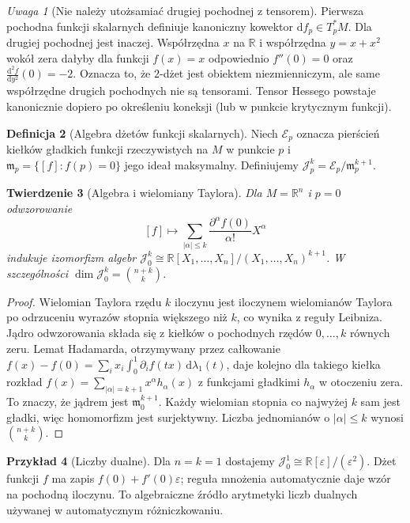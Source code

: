 \documentclass[11pt,a4paper,oneside]{book}
\numberwithin{equation}{chapter}
\theoremstyle{plain}
\newtheorem{twierdzenie}{Twierdzenie}[chapter]
\theoremstyle{definition}
\newtheorem{definicja}[twierdzenie]{Definicja}
\newtheorem{przyklad}[twierdzenie]{Przykład}
\theoremstyle{remark}
\newtheorem{uwaga}[twierdzenie]{Uwaga}
\begin{document}
\begin{uwaga}[Nie należy utożsamiać drugiej pochodnej z tensorem]
\label{rem:dzety-hess}
Pierwsza pochodna funkcji skalarnych definiuje kanoniczny
kowektor $\mathrm df_p\in T_p^*M$. Dla drugiej pochodnej jest inaczej.
Współrzędna $x$ na $\mathbb R$ i współrzędna $y=x+x^2$ wokół zera
dałyby dla funkcji $f(x)=x$ odpowiednio $f''(0)=0$
oraz $\frac{\mathrm d^2 f}{\mathrm dy^2}(0)=-2$.
Oznacza to, że $2$-dżet jest obiektem niezmienniczym,
ale same współrzędne drugich pochodnych nie są tensorami.
Tensor Hessego powstaje kanonicznie dopiero po określeniu
koneksji (lub w punkcie krytycznym funkcji).
\end{uwaga}

\begin{definicja}[Algebra dżetów funkcji skalarnych]
\label{def:dzety-algebra}
Niech $\mathcal E_p$ oznacza pierścień kiełków gładkich
funkcji rzeczywistych na $M$ w punkcie $p$ i
$\mathfrak m_p=\{[f]:f(p)=0\}$ jego ideał maksymalny.
Definiujemy $\mathcal J_p^k=\mathcal E_p/\mathfrak m_p^{k+1}$.
\end{definicja}

\begin{twierdzenie}[Algebra i wielomiany Taylora]
\label{thm:dzety-algebra}
Dla $M=\mathbb R^n$ i $p=0$ odwzorowanie
\[
 [f]\longmapsto \sum_{|\alpha|\le k}
 \frac{\partial^\alpha f(0)}{\alpha!}X^\alpha
\]
indukuje izomorfizm algebr
$\mathcal J_0^k\cong\mathbb R[X_1,\ldots,X_n]/(X_1,\ldots,X_n)^{k+1}$.
W szczególności $\dim\mathcal J_0^k=\binom{n+k}{k}$.
\end{twierdzenie}
\begin{proof}
Wielomian Taylora rzędu $k$ iloczynu jest iloczynem
wielomianów Taylora po odrzuceniu wyrazów stopnia większego niż $k$,
co wynika z reguły Leibniza. Jądro odwzorowania składa się
z kiełków o pochodnych rzędów $0,\ldots,k$ równych zeru.
Lemat Hadamarda, otrzymywany przez całkowanie
$f(x)-f(0)=\sum_i x_i\int_0^1 \partial_i f(tx)\,\mathrm d\lambda_1(t)$,
daje kolejno dla takiego kiełka rozkład
$f(x)=\sum_{|\alpha|=k+1}x^\alpha h_\alpha(x)$
z funkcjami gładkimi $h_\alpha$ w otoczeniu zera.
To znaczy, że jądrem jest $\mathfrak m_0^{k+1}$.
Każdy wielomian stopnia co najwyżej $k$ sam jest gładki,
więc homomorfizm jest surjektywny. Liczba jednomianów
o $|\alpha|\le k$ wynosi $\binom{n+k}{k}$.
\end{proof}

\begin{przyklad}[Liczby dualne]
\label{ex:dzety-dualne}
Dla $n=k=1$ dostajemy
$\mathcal J_0^1\cong\mathbb R[\varepsilon]/(\varepsilon^2)$.
Dżet funkcji $f$ ma zapis $f(0)+f'(0)\varepsilon$;
reguła mnożenia automatycznie daje wzór na pochodną iloczynu.
To algebraiczne źródło arytmetyki liczb dualnych używanej
w automatycznym różniczkowaniu.
\end{przyklad}
\end{document}
